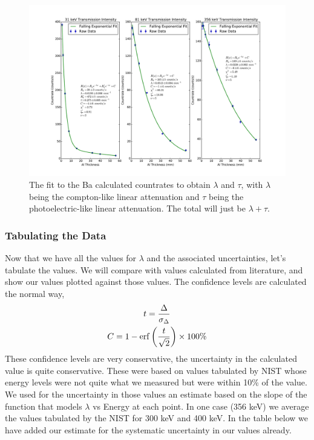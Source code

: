 \documentclass{article}
\newenvironment{tightcenter}{%
  \setlength\topsep{0pt}
  \setlength\parskip{0pt}
  \begin{center}
}{%
  \end{center}
}
\DeclareMathOperator\erf{erf}
\begin{document}
	\begin{tightcenter}
	\begin{figure}[!htb]
		\centering
		\includegraphics[scale=.5]{../plots/countrates_Ba.pdf}
		\caption{The fit to the Ba calculated countrates to obtain $\lambda$ and $\tau$, with $\lambda$ being the compton-like linear attenuation and $\tau$ being the photoelectric-like linear attenuation.  The total will just be $\lambda + \tau$.}
	\end{figure}
	\end{tightcenter}

	\subsubsection{Tabulating the Data}

	Now that we have all the values for $\lambda$ and the associated uncertainties, let's tabulate the values.  We will compare with values calculated from literature, and show our values plotted against those values.  The confidence levels are calculated the normal way, 
	\begin{gather*}
		t = \frac{\Delta}{\sigma_{\Delta}}\\
		C = 1-\erf\bigg{(}\frac{t}{\sqrt{2}}\bigg{)} \times 100\%
	\end{gather*}  
	These confidence levels are very conservative, the uncertainty in the calculated value is quite conservative.  These were based on values tabulated by NIST \cite{physics.nist.gov} whose energy levels were not quite what we measured but were within 10\% of the value.  We used for the uncertainty in those values an estimate based on the slope of the function that models $\lambda$ vs Energy at each point.  In one case (356 keV) we average the values tabulated by the NIST for 300 keV and 400 keV.  In the table below we have added our estimate for the systematic uncertainty in our values already.
\end{document}

